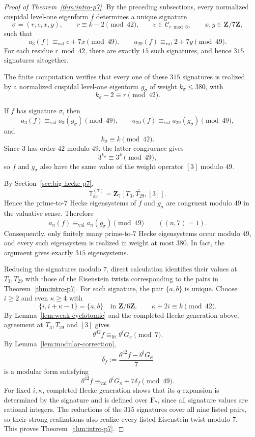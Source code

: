 \documentclass[11pt]{article}
\theoremstyle{plain}
\theoremstyle{definition}
\theoremstyle{remark}
\numberwithin{equation}{section}
\begin{document}
\begin{proof}[Proof of Theorem~\ref{thm:intro-p7}]

By the preceding subsections, every normalized cuspidal level-one eigenform \(f\) determines a unique signature \[ \sigma=(r,c,x,y), \qquad r\equiv k-2\pmod{42}, \qquad c\in\mathcal C_{r\bmod6}, \qquad x,y\in\mathbf Z/7\mathbf Z, \] such that \[ a_3(f)\equiv_{\mathrm{val}}c+7x\pmod{49}, \qquad a_{29}(f)\equiv_{\mathrm{val}}2+7y\pmod{49}. \] For each residue \(r\bmod42\), there are exactly \(15\) such signatures, and hence \(315\) signatures altogether.

The finite computation verifies that every one of these \(315\) signatures is realized by a normalized cuspidal level-one eigenform \(g_\sigma\) of weight \(k_\sigma\leq380\), with \[ k_\sigma-2\equiv r\pmod{42}. \]

If \(f\) has signature \(\sigma\), then \[ a_3(f)\equiv_{\mathrm{val}}a_3(g_\sigma)\pmod{49}, \qquad a_{29}(f)\equiv_{\mathrm{val}}a_{29}(g_\sigma)\pmod{49}, \] and \[ k_\sigma\equiv k\pmod{42}. \] Since \(3\) has order \(42\) modulo \(49\), the latter congruence gives \[ 3^{k_\sigma}\equiv3^k\pmod{49}, \] so \(f\) and \(g_\sigma\) also have the same value of the weight operator \([3]\) modulo \(49\).

By Section~\ref{sec:big-hecke-p7}, \[\mathbb T_{\mathrm{dc}}^{(7)} = \overline{\mathbf Z_7[T_3,T_{29},[3]]}. \] Hence the prime-to-\(7\) Hecke eigensystems of \(f\) and \(g_\sigma\) are congruent modulo \(49\) in the valuative sense. Therefore \[ a_n(f)\equiv_{\mathrm{val}}a_n(g_\sigma)\pmod{49} \qquad ((n,7)=1). \] Consequently, only finitely many prime-to-\(7\) Hecke eigensystems occur modulo \(49\), and every such eigensystem is realized in weight at most \(380\).  In fact, the argument gives exactly \(315\) eigensystems.

Reducing the signatures modulo \(7\), direct calculation identifies their values at \(T_3,T_{29}\) with those of the Eisenstein twists corresponding to the pairs in Theorem~\ref{thm:intro-p7}. For each signature, the pair \(\{a,b\}\) is unique. Choose \(i\geq2\) and even \(\kappa\geq4\) with \[ \{i,i+\kappa-1\}=\{a,b\} \quad\text{in }\mathbf Z/6\mathbf Z, \qquad \kappa+2i\equiv k\pmod{42}. \] By Lemma~\ref{lem:weak-cyclotomic} and the completed-Hecke generation above, agreement at \(T_3,T_{29}\) and \([3]\) gives \[ \theta^{42}f\equiv_{\mathrm{lit}} \theta^iG_\kappa\pmod7. \] By Lemma~\ref{lem:modular-correction}, \[ \delta_f:= \overline{\frac{\theta^{42}f-\theta^iG_\kappa}{7}} \] is a modular form satisfying \[ \theta^{42}f\equiv_{\mathrm{val}} \theta^iG_\kappa+7\delta_f\pmod{49}. \] For fixed \(i,\kappa\), completed-Hecke generation shows that its \(q\)-expansion is determined by the signature and is defined over \(\mathbf F_7\), since all signature values are rational integers. The reductions of the \(315\) signatures cover all nine listed pairs, so their strong realizations also realize every listed Eisenstein twist modulo \(7\). This proves Theorem~\ref{thm:intro-p7}.
\end{proof}
\end{document}
